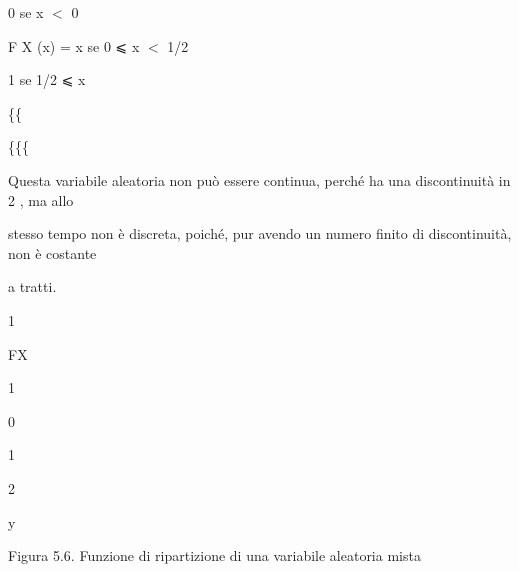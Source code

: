 \documentclass[a4paper,portrait,12pt]{article}
\begin{document}
\begin{flushleft}
0 se x $<$ 0
\end{flushleft}


\begin{flushleft}
F X (x) = x se 0 ⩽ x $<$ 1/2
\end{flushleft}


\begin{flushleft}
1 se 1/2 ⩽ x
\end{flushleft}





\{\{


\{\{\{





\begin{flushleft}
Questa variabile aleatoria non pu\`{o} essere continua, perch\'{e} ha una discontinuit\`{a} in 2 , ma allo
\end{flushleft}


\begin{flushleft}
stesso tempo non \`{e} discreta, poich\'{e}, pur avendo un numero finito di discontinuit\`{a}, non \`{e} costante
\end{flushleft}


\begin{flushleft}
a tratti.
\end{flushleft}


1





\begin{flushleft}
FX
\end{flushleft}


1





0





1


2





\begin{flushleft}
y
\end{flushleft}





\begin{flushleft}
Figura 5.6. Funzione di ripartizione di una variabile aleatoria mista
\end{flushleft}
\end{document}
